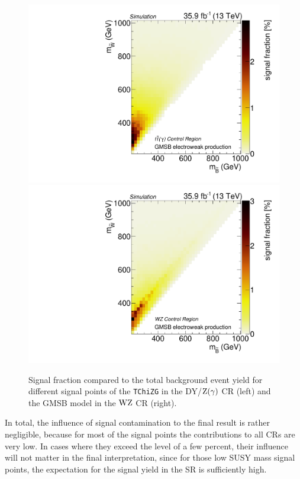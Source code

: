 \begin{figure}
 \includegraphics[width=\pairwidth]{figures/contamination/gmsb_tt}
 \includegraphics[width=\pairwidth]{figures/contamination/gmsb_WZ}
 \caption{Signal fraction compared to the total background event yield for different signal points of the \texttt{TChiZG} in the DY/$\mathrm{Z}(\gamma)$ CR (left) and the GMSB model in the $\mathrm{W}\mathrm{Z}$ CR (right).}
 \label{fig:signalCont}
\end{figure}
In total, the influence of signal contamination to the final result is rather negligible, because for most of the signal points the contributions to all CRs are very low. In cases where they exceed the level of a few percent, their influence will not matter in the final interpretation, since for those low SUSY mass signal points, the expectation for the signal yield in the SR is sufficiently high.


